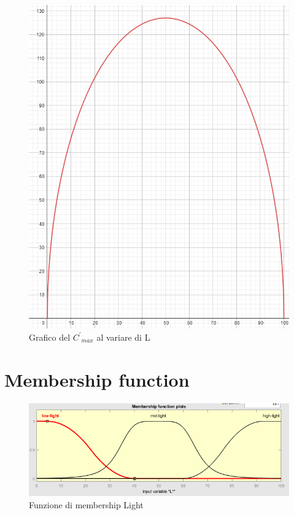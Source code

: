 \begin{figure}
\begin{center}
	\includegraphics[scale=0.5]{images/geogebra-export.png}
\end{center}
\caption{Grafico del \({C^{'}}_{max}\) al variare di L}
\end{figure}

\section{Membership function}
\begin{figure}
\begin{center}
	\includegraphics[scale=0.8]{images/rete2-membership-light.PNG}
\end{center}
\caption{Funzione di membership Light}
\end{figure}

